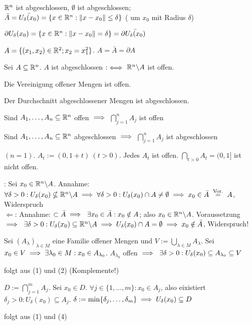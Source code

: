 \documentclass[a4paper,twoside,DIV15,BCOR12mm]{scrbook}
\begin{document}
\begin{beispiele}
\item $\mathbb{R}^n$ ist abgeschlossen, $\emptyset$ ist abgeschlossen; \\ 
  $\bar{A}=\bar{U_\delta(x_0)} = \{x\in\mathbb{R}^n: \|x-x_0\| \le \delta\}$ ( um $x_0$ mit Radius $\delta$)
\item $\partial U_\delta(x_0) = \{x\in\mathbb{R}^n: \|x-x_0\|=\delta\} = \partial \bar{U_\delta(x_0)}$
\item $A = \{(x_1,x_2)\in\mathbb{R}^2; x_2 = x_1^2\}$. $A=\bar{A}=\partial A$
\end{beispiele}

\begin{satz}
 \begin{liste}
 \item Sei $A\subseteq\mathbb{R}^n$. $A$ ist abgeschlossen $:\iff$  $\mathbb{R}^n\backslash A$ ist offen.
 \item Die Vereinigung offener Mengen ist offen.
 \item Der Durchschnitt abgeschlossener Mengen ist abgeschlossen.
 \item Sind $A_1,\ldots,A_n\subseteq\mathbb{R}^n$ offen $\implies$ $\bigcap_{j=1}^nA_j$ ist offen
 \item Sind $A_1,\ldots,A_n\subseteq\mathbb{R}^n$ abgeschlossen $\implies$ $\bigcap_{j=1}^nA_j$ ist abgeschlossen
 \end{liste}
\end{satz}

\begin{beispiel}
  $(n=1)$. $A_t := (0,1+t)\ (t>0)$. Jedes $A_t$ ist offen. $\bigcap_{t>0}A_t = (0,1]$ ist nicht offen.
\end{beispiel}

\begin{beweise}
 \item \glqq\folgt\grqq: Sei $x_0\in\mathbb{R}^n\backslash A$. Annahme: $\forall \delta>0: U_\delta(x_0) \nsubseteq \MdR^n\backslash A\folgt\forall\delta>0: U_\delta(x_0)\cap A\ne\emptyset \folgt x_0\in\bar{A} \gleichnach{Vor.} A$, Widerspruch \\
 \glqq$\Leftarrow$\grqq: Annahme: $\subset\bar{A} \implies \ \exists x_0\in\bar{A}: x_0\notin A$; also $x_0\in\mathbb{R}^n\backslash A$. Voraussetzung $\implies \ \exists \delta > 0: U_\delta(x_0) \subseteq \mathbb{R}^n\backslash A \implies U_\delta(x_0) \cap A = \emptyset \implies x_0 \notin \bar{A}$, Widerspruch!
 \item Sei $(A_\lambda)_{\lambda\in M}$ eine Familie offener Mengen und $V := \bigcup_{\lambda\in M} A_\lambda$. Sei $x_0\in V \implies \exists\lambda_0\in M: x_0 \in A_{\lambda_0}$. $A_{\lambda_0}$ offen $\implies \ \exists \delta > 0: U_\delta(x_0) \subseteq A_{\lambda_0} \subseteq V$
 \item folgt aus (1) und (2) (Komplemente!)
 \item $D:=\bigcap_{j=1}^mA_j$. Sei $x_0\in D$. $\forall j\in\{1,\ldots,m\}: x_0\in A_j$, also eixistiert $\delta_j>0: U_\delta(x_0)\subseteq A_j$. $\delta := \min\{\delta_j,\ldots,\delta_m\} \implies U_\delta(x_0) \subseteq D$
 \item folgt aus (1) und (4)
\end{beweise}
\end{document}
